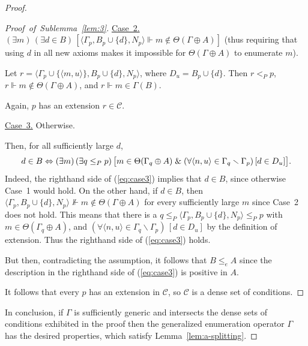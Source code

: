 \documentclass[11pt]{amsart}
\newcommand{\QA}[1]{(\forall{#1})\,}
\newcommand{\QE}[1]{(\exists{#1})\,}
\begin{document}
\begin{proof}
\begin{proof}[Proof~of~Sublemma~\ref{lem:3}]
\underline{Case~2.} $\QE{m}\QE{d \in B}[ \langle \Gamma_p, B_p\cup \{d\}, 
N_p\rangle \Vdash m \notin \Theta(\Gamma \oplus A)]$ (thus requiring that 
using $d$ in all new axioms makes it impossible for $\Theta(\Gamma \oplus A)$ 
to enumerate $m$). 

Let $r=\langle \Gamma_p \cup \{\langle m, u \rangle\}, 
B_p\cup\{d\}, N_p \rangle$, where $D_u = B_p\cup \{d\}$. Then $r<_P p$, 
$r\Vdash m \notin \Theta(\Gamma 
\oplus A)$, and $r \Vdash m \in \Gamma(B)$. 

Again, $p$ has an extension $r \in \mathcal{C}$.

\underline{Case~3.} Otherwise. 

Then, for all sufficiently large $d$, 
\begin{equation}\label{eq:case3}
d \in B \Leftrightarrow\\
\QE{m}\QE{q \leq_P p}
\big[m \in \Theta (\Gamma_q \oplus A)\;\&\; \QA{\langle n, u\rangle \in 
\Gamma_q \smallsetminus \Gamma_p} 
    [d \in D_u]\big].
\end{equation}
Indeed, the righthand side of (\ref{eq:case3}) implies that $d\in B$, since 
otherwise Case~1 would hold. On the other hand, if $d \in B$, then 
$\langle\Gamma_p, B_p\cup \{d\}, N_p\rangle \nVdash m \notin \Theta(\Gamma 
\oplus A)$ for every sufficiently large $m$ since Case~2 does not hold. This 
means that there is a $q \leq_P \langle\Gamma_p, B_p\cup \{d\}, N_p\rangle 
\leq_P p$ with $m \in \Theta(\Gamma_q \oplus A)$, and $\QA{\langle n, 
u\rangle \in \Gamma_q \smallsetminus \Gamma_p}[d \in D_u]$ by the definition 
of extension.  Thus the righthand side of (\ref{eq:case3}) holds. 

But then, contradicting the assumption, it follows that $B\leq_e A$ since the 
description in the righthand side of (\ref{eq:case3}) is positive in $A$. 

It follows that every $p$ has an extension in $\mathcal{C}$, so $\mathcal{C}$ 
is a dense set of conditions. 
\end{proof}

In conclusion, if $\Gamma$ is sufficiently generic and intersects the dense 
sets of conditions exhibited in the proof then the generalized enumeration 
operator $\Gamma$ has the desired properties, which satisfy 
Lemma~\ref{lem:a-splitting}. 
\end{proof}
\end{document}
